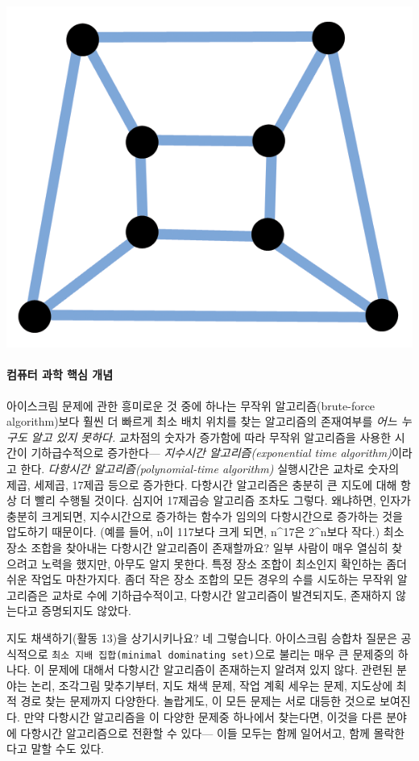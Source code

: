 \documentclass[]{article}
\begin{document}
\includegraphics{csunplugged/04-part/img/ch15-dominating-sets/14-dominating-sets-04-variations.png}

\mbox{}\paragraph{컴퓨터 과학 핵심 개념}\label{section-208}

아이스크림 문제에 관한 흥미로운 것 중에 하나는 무작위
알고리즘(brute-force algorithm)보다 훨씬 더 빠르게 최소 배치 위치를 찾는
알고리즘의 존재여부를 \emph{어느 누구도 알고 있지 못하다.} 교차점의
숫자가 증가함에 따라 무작위 알고리즘을 사용한 시간이 기하급수적으로
증가한다--- \emph{지수시간 알고리즘(exponential time algorithm)}이라고
한다. \emph{다항시간 알고리즘(polynomial-time algorithm)} 실행시간은
교차로 숫자의 제곱, 세제곱, 17제곱 등으로 증가한다. 다항시간 알고리즘은
충분히 큰 지도에 대해 항상 더 빨리 수행될 것이다. 심지어 17제곱승
알고리즘 조차도 그렇다. 왜냐하면, 인자가 충분히 크게되면, 지수시간으로
증가하는 함수가 임의의 다항시간으로 증가하는 것을 압도하기 때문이다.
(예를 들어, n이 117보다 크게 되면, n\^{}17은 2\^{}n보다 작다.) 최소 장소
조합을 찾아내는 다항시간 알고리즘이 존재할까요? 일부 사람이 매우 열심히
찾으려고 노력을 했지만, 아무도 알지 못한다. 특정 장소 조합이 최소인지
확인하는 좀더 쉬운 작업도 마찬가지다. 좀더 작은 장소 조합의 모든 경우의
수를 시도하는 무작위 알고리즘은 교차로 수에 기하급수적이고, 다항시간
알고리즘이 발견되지도, 존재하지 않는다고 증명되지도 않았다.

지도 채색하기(활동 13)을 상기시키나요? 네 그렇습니다. 아이스크림 승합차
질문은 공식적으로 \texttt{최소 지배 집합(minimal dominating set)}으로
불리는 매우 큰 문제중의 하나다. 이 문제에 대해서 다항시간 알고리즘이
존재하는지 알려져 있지 않다. 관련된 분야는 논리, 조각그림 맞추기부터,
지도 채색 문제, 작업 계획 세우는 문제, 지도상에 최적 경로 찾는 문제까지
다양한다. 놀랍게도, 이 모든 문제는 서로 대등한 것으로 보여진다. 만약
다항시간 알고리즘을 이 다양한 문제중 하나에서 찾는다면, 이것을 다른
분야에 다항시간 알고리즘으로 전환할 수 있다--- 이들 모두는 함께
일어서고, 함께 몰락한다고 말할 수도 있다.
\end{document}
